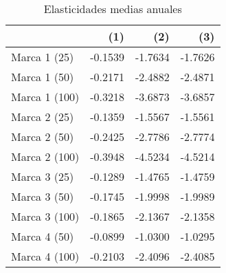 \begin{table}
\centering
\caption{Elasticidades medias anuales}
\begin{tabular}{lrrr}
\toprule
{} &     (1) &     (2) &     (3) \\
\midrule
Marca 1 (25)  & -0.1539 & -1.7634 & -1.7626 \\
Marca 1 (50)  & -0.2171 & -2.4882 & -2.4871 \\
Marca 1 (100) & -0.3218 & -3.6873 & -3.6857 \\
Marca 2 (25)  & -0.1359 & -1.5567 & -1.5561 \\
Marca 2 (50)  & -0.2425 & -2.7786 & -2.7774 \\
Marca 2 (100) & -0.3948 & -4.5234 & -4.5214 \\
Marca 3 (25)  & -0.1289 & -1.4765 & -1.4759 \\
Marca 3 (50)  & -0.1745 & -1.9998 & -1.9989 \\
Marca 3 (100) & -0.1865 & -2.1367 & -2.1358 \\
Marca 4 (50)  & -0.0899 & -1.0300 & -1.0295 \\
Marca 4 (100) & -0.2103 & -2.4096 & -2.4085 \\
\bottomrule
\end{tabular}
\end{table}
